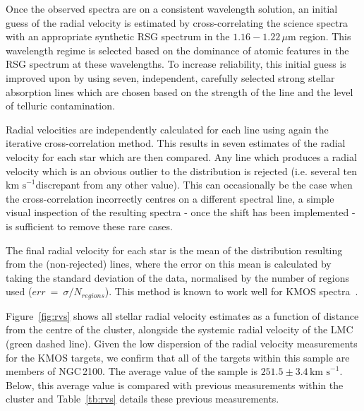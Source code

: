 \documentclass[useAMS,usenatbib]{mn2e}
\def\kms{$\mbox{km s}^{-1}$}
\begin{document}
Once the observed spectra are on a consistent wavelength solution, an initial guess of the radial velocity is estimated by cross-correlating the science spectra with an appropriate synthetic RSG spectrum in the $1.16-1.22\,\mu$m region.
This wavelength regime is selected based on the dominance of atomic features in the RSG spectrum at these wavelengths.
To increase reliability, this initial guess is improved upon by using seven, independent, carefully selected strong stellar absorption lines which are chosen based on the strength of the line and the level of telluric contamination.

Radial velocities are independently calculated for each line using again the iterative cross-correlation method.
This results in seven estimates of the radial velocity for each star which are then compared.
Any line which produces a radial velocity which is an obvious outlier to the distribution is rejected (i.e. several ten \kms discrepant from any other value).
This can occasionally be the case when the cross-correlation incorrectly centres on a different spectral line, a simple visual inspection of the resulting spectra - once the shift has been implemented - is sufficient to remove these rare cases.

The final radial velocity for each star is the mean of the distribution resulting from the (non-rejected) lines,
where the error on this mean is calculated by taking the standard deviation of the data, normalised by the number of regions used ($err~=~\sigma/N_{regions}$).
This method is known to work well for KMOS spectra~\citep{2015ApJ...798...23L,2015ApJ...803...14P}.

Figure~\ref{fig:rvs} shows all stellar radial velocity estimates as a function of distance from the centre of the cluster, alongside the systemic radial velocity of the LMC (green dashed line).
Given the low dispersion of the radial velocity measurements for the KMOS targets, we confirm that all of the targets within this sample are members of NGC\,2100.
The average value of the sample is $251.5\pm3.4\,$\kms.
Below, this average value is compared with previous measurements within the cluster and
Table~\ref{tb:rvs} details these previous measurements.
\end{document}
